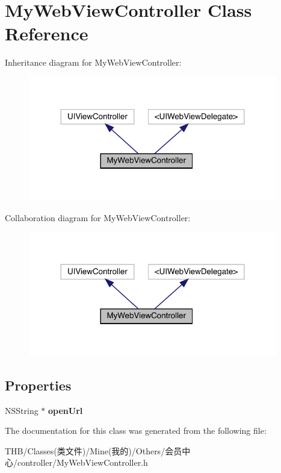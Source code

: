 \hypertarget{interface_my_web_view_controller}{}\section{My\+Web\+View\+Controller Class Reference}
\label{interface_my_web_view_controller}


Inheritance diagram for My\+Web\+View\+Controller\+:\nopagebreak
\begin{figure}[H]
\begin{center}
\leavevmode
\includegraphics[width=308pt]{interface_my_web_view_controller__inherit__graph}
\end{center}
\end{figure}


Collaboration diagram for My\+Web\+View\+Controller\+:\nopagebreak
\begin{figure}[H]
\begin{center}
\leavevmode
\includegraphics[width=308pt]{interface_my_web_view_controller__coll__graph}
\end{center}
\end{figure}
\subsection*{Properties}
\begin{DoxyCompactItemize}
\item 
\mbox{\label{interface_my_web_view_controller_adadbc71744ac32f9b0c792e68fa80d97}} 
N\+S\+String $\ast$ {\bfseries open\+Url}
\end{DoxyCompactItemize}


The documentation for this class was generated from the following file\+:\begin{DoxyCompactItemize}
\item 
T\+H\+B/\+Classes(类文件)/\+Mine(我的)/\+Others/会员中心/controller/My\+Web\+View\+Controller.\+h\end{DoxyCompactItemize}
